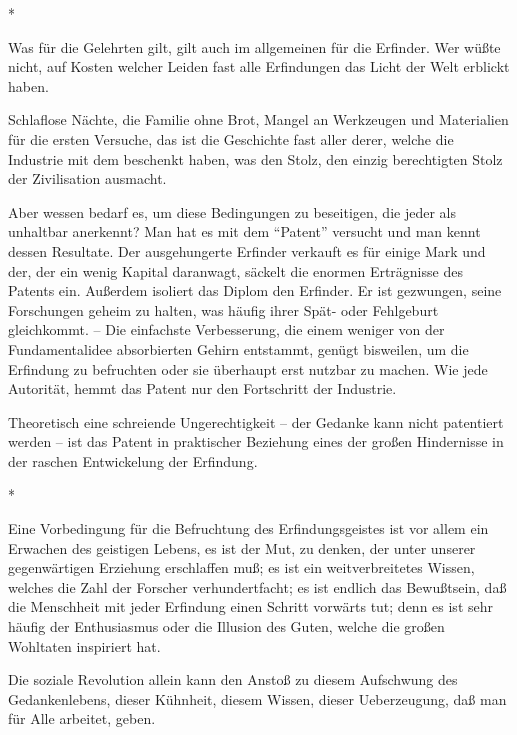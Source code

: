 \documentclass{scrbook}
\begin{document}
\begin{center}*\end{center}

Was für die Gelehrten gilt, gilt auch im allgemeinen für die Erfinder. Wer wüßte nicht, auf Kosten welcher Leiden fast alle Erfindungen das Licht der Welt erblickt haben.

Schlaflose Nächte, die Familie ohne Brot, Mangel an Werkzeugen und Materialien für die ersten Versuche, das ist die Geschichte fast aller derer, welche die Industrie mit dem beschenkt haben, was den Stolz, den einzig berechtigten Stolz der Zivilisation ausmacht.

Aber wessen bedarf es, um diese Bedingungen zu beseitigen, die jeder als unhaltbar anerkennt? Man hat es mit dem ``Patent'' versucht und man kennt dessen Resultate. Der ausgehungerte Erfinder verkauft es für einige Mark und der, der ein wenig Kapital daranwagt, säckelt die enormen Erträgnisse des Patents ein. Außerdem isoliert das Diplom den Erfinder. Er ist gezwungen, seine Forschungen geheim zu halten, was häufig ihrer Spät- oder Fehlgeburt gleichkommt. – Die einfachste Verbesserung, die einem weniger von der Fundamentalidee absorbierten Gehirn entstammt, genügt bisweilen, um die Erfindung zu befruchten oder sie überhaupt erst nutzbar zu machen. Wie jede Autorität, hemmt das Patent nur den Fortschritt der Industrie.

Theoretisch eine schreiende Ungerechtigkeit – der Gedanke kann nicht patentiert werden – ist das Patent in praktischer Beziehung eines der großen Hindernisse in der raschen Entwickelung der Erfindung.

\begin{center}*\end{center}

Eine Vorbedingung für die Befruchtung des Erfindungsgeistes ist vor allem ein Erwachen des geistigen Lebens, es ist der Mut, zu denken, der unter unserer gegenwärtigen Erziehung erschlaffen muß; es ist ein weitverbreitetes Wissen, welches die Zahl der Forscher verhundertfacht; es ist endlich das Bewußtsein, daß die Menschheit mit jeder Erfindung einen Schritt vorwärts tut; denn es ist sehr häufig der Enthusiasmus oder die Illusion des Guten, welche die großen Wohltaten inspiriert hat.

Die soziale Revolution allein kann den Anstoß zu diesem Aufschwung des Gedankenlebens, dieser Kühnheit, diesem Wissen, dieser Ueberzeugung, daß man für Alle arbeitet, geben.
\end{document}
